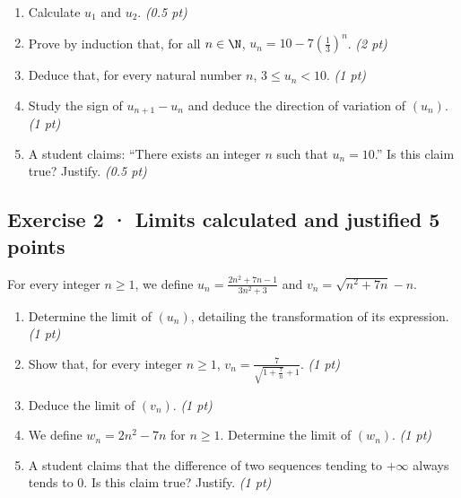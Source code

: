 \begin{enumerate}

\item Calculate $u_1$ and $u_2$. \hfill\textit{(0.5 pt)}

\item Prove by induction that, for all $n\in\N$, $u_n=10-7\left(\frac{1}{3}\right)^n$. \hfill\textit{(2 pt)}

\item Deduce that, for every natural number $n$, $3\le u_n<10$. \hfill\textit{(1 pt)}

\item Study the sign of $u_{n+1}-u_n$ and deduce the direction of variation of $(u_n)$. \hfill\textit{(1 pt)}

\item A student claims: ``There exists an integer $n$ such that $u_n=10$.'' Is this claim true? Justify. \hfill\textit{(0.5 pt)}

\end{enumerate}

\subsection*{Exercise 2 · Limits calculated and justified \hfill 5 points}For every integer $n\ge1$, we define $u_n=\frac{2n^2+7n-1}{3n^2+3}$ and $v_n=\sqrt{n^2+7n}-n$.

\begin{enumerate}

\item Determine the limit of $(u_n)$, detailing the transformation of its expression. \hfill\textit{(1 pt)}

\item Show that, for every integer $n\ge1$, $v_n=\frac{7}{\sqrt{1+\frac{7}n}+1}$. \hfill\textit{(1 pt)}

\item Deduce the limit of $(v_n)$. \hfill\textit{(1 pt)}

\item We define $w_n=2n^2-7n$ for $n\ge1$. Determine the limit of $(w_n)$. \hfill\textit{(1 pt)}

\item A student claims that the difference of two sequences tending to $+\infty$ always tends to $0$. Is this claim true? Justify. \hfill\textit{(1 pt)}

\end{enumerate}

\mxnewpage{}

